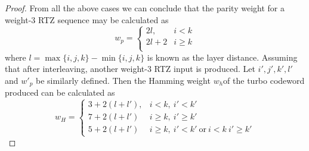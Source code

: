 \documentclass[11pt, oneside, dvipdfmx]{book}
\begin{document}
\begin{proof}
From all the above cases we can conclude that the parity weight for a weight-$3$ RTZ sequence may be calculated as
\begin{equation}
w_p=
\begin{cases}
2l,& i<k \\
2l+2 & i \geq k\\
\end{cases}
\end{equation}
where $l=\max \{ i,j,k \} - \min \{ i,j,k \}$ is known as the layer distance.
Assuming that after interleaving, another weight-$3$ RTZ input is produced. Let $i',j',k',l'$ and $w'_p$ be similarly defined. Then the Hamming weight $w_h$of the turbo codeword produced can be calculated as
\begin{equation}
w_H=
\begin{cases}
3+2(l+l'),& i<k ,~i'<k'\\
7+2(l+l') & i \geq k,~i' \geq k'\\
5+2(l+l')& i \geq k,~i'<k' ~\text{or}~i<k ~ i' \geq k'
\end{cases}
\end{equation}

\end{proof}
\newpage
\end{document}
